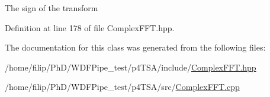 The sign of the transform 

Definition at line 178 of file Complex\+F\+F\+T.\+hpp.



The documentation for this class was generated from the following files\+:\begin{DoxyCompactItemize}
\item 
/home/filip/\+Ph\+D/\+W\+D\+F\+Pipe\+\_\+test/p4\+T\+S\+A/include/\hyperlink{_complex_f_f_t_8hpp}{Complex\+F\+F\+T.\+hpp}\item 
/home/filip/\+Ph\+D/\+W\+D\+F\+Pipe\+\_\+test/p4\+T\+S\+A/src/\hyperlink{_complex_f_f_t_8cpp}{Complex\+F\+F\+T.\+cpp}\end{DoxyCompactItemize}
